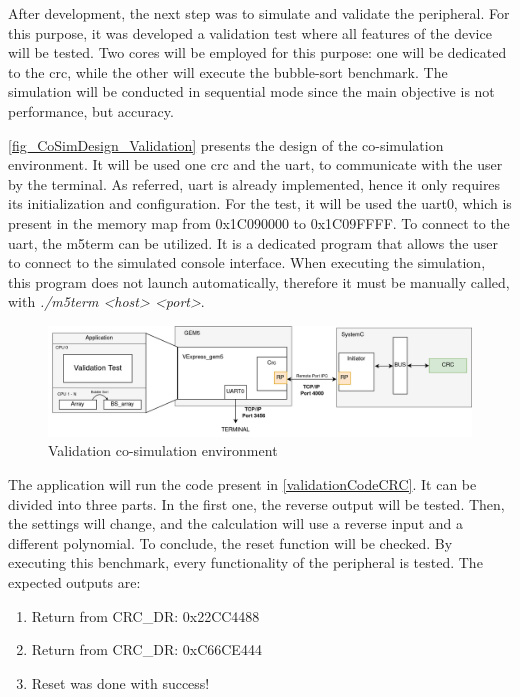 After development, the next step was to simulate and validate the peripheral. For this purpose, it was developed a validation test where
all features of the device will be tested. Two cores will be employed for this purpose: one will be dedicated to the 
\gls{crc}, while the other will execute the bubble-sort benchmark. The simulation will be conducted in sequential mode since 
the main objective is not performance, but accuracy.

\autoref{fig_CoSimDesign_Validation} presents the design of the co-simulation environment. 
It will be used one \gls{crc} and the \gls{uart}, to communicate with the user by the terminal.
As referred, \gls{uart} is already implemented, hence it only requires its initialization and configuration. For the test, it will be used the 
\gls{uart}0, which is present in the memory map from 0x1C090000 to 0x1C09FFFF.
To connect to the \gls{uart}, the m5term can be utilized. It is
a dedicated program that allows the user to connect to the simulated console interface. When executing the simulation, this program does not
launch automatically, therefore it must be manually called, with \textit{./m5term <host> <port>}.

\begin{figure}[H]
	\centering
 	\includegraphics[width=1\linewidth]{Images/CoSimDesign_Validation.png} 
 	\caption{Validation co-simulation environment}
	\label{fig_CoSimDesign_Validation}
\end{figure}

The application will run the code present in \ref{validationCodeCRC}. It can be divided into three parts. In the first one, the reverse 
output will be tested. Then, the settings will change, and the calculation will use a reverse input and a different polynomial. To
conclude, the reset function will be checked. By executing this benchmark, every functionality of the peripheral is tested. The expected
outputs are:

\begin{enumerate}
	\item Return from CRC\_DR: 0x22CC4488
	\item Return from CRC\_DR: 0xC66CE444
	\item Reset was done with success!
\end{enumerate}

